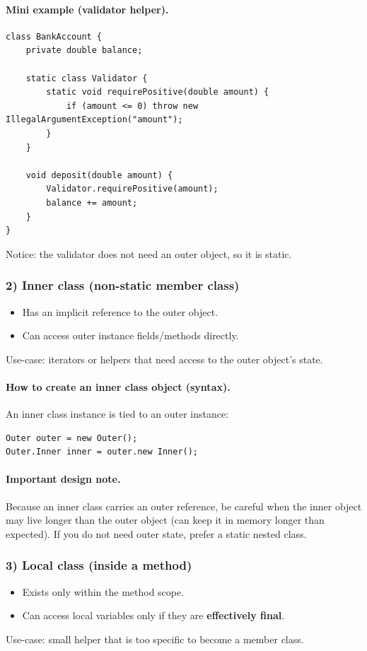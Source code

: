 \documentclass[11pt]{article}
\begin{document}
\paragraph{Mini example (validator helper).}
\begin{lstlisting}
class BankAccount {
    private double balance;

    static class Validator {
        static void requirePositive(double amount) {
            if (amount <= 0) throw new IllegalArgumentException("amount");
        }
    }

    void deposit(double amount) {
        Validator.requirePositive(amount);
        balance += amount;
    }
}
\end{lstlisting}
Notice: the validator does not need an outer object, so it is static.

\subsubsection{2) Inner class (non-static member class)}
\begin{itemize}
  \item Has an implicit reference to the outer object.
  \item Can access outer instance fields/methods directly.
\end{itemize}
Use-case: iterators or helpers that need access to the outer object's state.

\paragraph{How to create an inner class object (syntax).}
An inner class instance is tied to an outer instance:
\begin{lstlisting}
Outer outer = new Outer();
Outer.Inner inner = outer.new Inner();
\end{lstlisting}

\paragraph{Important design note.}
Because an inner class carries an outer reference, be careful when the inner object may live longer than the outer object (can keep it in memory longer than expected).
If you do not need outer state, prefer a static nested class.

\subsubsection{3) Local class (inside a method)}
\begin{itemize}
  \item Exists only within the method scope.
  \item Can access local variables only if they are \textbf{effectively final}.
\end{itemize}
Use-case: small helper that is too specific to become a member class.
\end{document}
